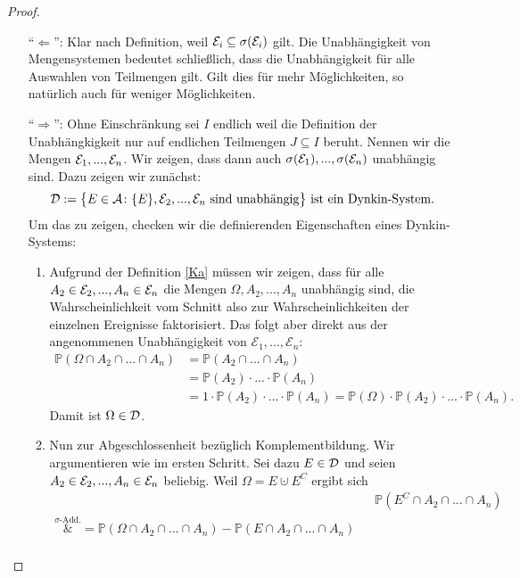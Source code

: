 \begin{proof}\abs
	\begin{itemize}
		\item[\enquote{$\Leftarrow$}:] Klar nach Definition, weil $\mathcal{E}_i \subseteq \sigma(\mathcal{E}_i)$ gilt. Die Unabh\"angigkeit von Mengensystemen bedeutet schlie\ss lich, dass die Unabh\"angigkeit f\"ur alle Auswahlen von Teilmengen gilt. Gilt dies f\"ur mehr M\"oglichkeiten, so nat\"urlich auch f\"ur weniger M\"oglichkeiten.
		\item[\enquote{$\Rightarrow$}:] Ohne Einschr\"ankung sei $I$ endlich weil die Definition der Unabh\"angkigkeit nur auf endlichen Teilmengen $J \subseteq I$ beruht. Nennen wir die Mengen $\mathcal{E}_1,...,\mathcal{E}_n$. Wir zeigen, dass dann auch $\sigma(\mathcal{E}_1),...,\sigma(\mathcal{E}_n)$ unabhängig sind. Dazu zeigen wir zun\"achst:
		$$\mathcal{D}:= \big\{ E \in \mathcal{A} \colon \{ E \}, \mathcal{E}_2, ..., \mathcal{E}_n \text{ sind unabhängig} \big\}\text{ ist ein Dynkin-System.}$$
		Um das zu zeigen, checken wir die definierenden Eigenschaften eines Dynkin-Systems:
		\begin{enumerate}[label=(\roman*)]
			\item Aufgrund der Definition \ref{Ka} m\"ussen wir zeigen, dass f\"ur alle $ A_2 \in \mathcal{E}_2,...,A_n \in \mathcal{E}_n$ die Mengen $\Omega, A_2,...,A_n$ unabhängig sind, die Wahrscheinlichkeit vom Schnitt also zur Wahrscheinlichkeiten der einzelnen Ereignisse faktorisiert. Das folgt aber direkt aus der angenommenen Unabh\"angigkeit von $\mathcal E_1, ..., \mathcal E_n$:			
			\begin{align*}
				\mathbb{P}(\Omega \cap A_2 \cap ... \cap A_n) &= \mathbb{P}(A_2 \cap ... \cap A_n)\\
				 &= \mathbb{P}(A_2) \cdot ... \cdot \mathbb{P}(A_n)\\
				 & = 1 \cdot \mathbb{P}(A_2) \cdot ... \cdot \mathbb{P}(A_n)
				  = \mathbb{P}(\Omega) \cdot \mathbb{P}(A_2) \cdot ... \cdot \mathbb{P}(A_n).
			\end{align*}
			Damit ist $\Omega \in \mathcal{D}$.
			\item Nun zur Abgeschlossenheit bez\"uglich Komplementbildung. Wir argumentieren wie im ersten Schritt. Sei dazu $E \in \mathcal{D}$ und seien $A_2 \in \mathcal{E}_2,...,A_n \in \mathcal{E}_n$ beliebig. Weil $\Omega=E\cupdot E^C$ ergibt sich
			\begin{align*}
				&\quad \mathbb{P}(E^C \cap A_2 \cap ... \cap A_n)\\
				 \overset{\sigma\text{-Add.}}&{=} \mathbb{P}(\Omega \cap A_2 \cap ... \cap A_n) - \mathbb{P}(E \cap A_2 \cap ... \cap A_n) \\

\end{align*}
\end{enumerate}
\end{itemize}
\end{proof}
